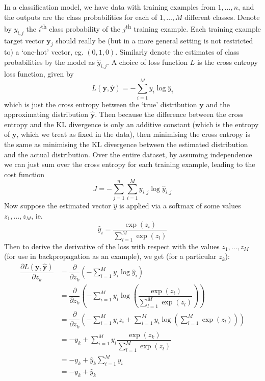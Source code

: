 \documentclass[11pt]{report} %
\begin{document}
In a classification model, we have data with training examples from $1, \dots, n$, and the outputs are the class probabilities for each of $1, \dots, M$ different classes. Denote by $y_{i, j}$ the $i$\textsuperscript{th} class probability of the $j$\textsuperscript{th} training example. Each training example target vector $\mathbf{y}_{j}$ should really be (but in a more general setting is not restricted to) a `one-hot' vector, eg. $\left(0, 1, 0\right)$. Similarly denote the estimates of class probabilities by the model as $\hat{y}_{i, j}$. A choice of loss function $L$ is the cross entropy loss function, given by
\begin{equation}
L\left(\mathbf{y}, \hat{\mathbf{y}}\right) = -\sum_{i = 1}^{M}y_{i}\log\hat{y}_{i}
\end{equation}
which is just the cross entropy between the `true' distribution $\mathbf{y}$ and the approximating distribution $\hat{\mathbf{y}}$. Then because the difference between the cross entropy and the KL divergence is only an additive constant (which is the entropy of $\mathbf{y}$, which we treat as fixed in the data), then minimising the cross entropy is the same as minimising the KL divergence between the estimated distribution and the actual distribution. Over the entire dataset, by assuming independence we can just sum over the cross entropy for each training example, leading to the cost function
\begin{equation}
J = -\sum_{j = 1}^{n}\sum_{i = 1}^{M}y_{i, j}\log\hat{y}_{i, j}
\end{equation}
Now suppose the estimated vector $\hat{y}$ is applied via a softmax of some values $z_{1}, \dots, z_{M}$, ie.
\begin{equation}
\hat{y}_{i} = \dfrac{\exp{\left(z_{i}\right)}}{\sum_{l = 1}^{M}\exp\left(z_{l}\right)}
\end{equation}
Then to derive the derivative of the loss with respect with the values $z_{1}, \dots, z_{M}$ (for use in backpropagation as an example), we get (for a particular $z_{k}$):
\begin{align}
\dfrac{\partial L\left(\mathbf{y}, \hat{\mathbf{y}}\right)}{\partial z_{k}} &= \dfrac{\partial}{\partial z_{k}}\left(-\sum_{i = 1}^{M}y_{i}\log \hat{y}_{i}\right) \\
&= \dfrac{\partial}{\partial z_{k}}\left(-\sum_{i=1}^{M}y_{i}\log\left(\dfrac{\exp\left(z_{i}\right)}{\sum_{l=1}^{M}\exp\left(z_{l}\right)}\right)\right) \\
&= \dfrac{\partial}{\partial z_{k}}\left(-\sum_{i=1}^{M}y_{i}z_{i}+\sum_{i=1}^{M}y_{i}\log\left(\sum_{l=1}^{M}\exp\left(z_{l}\right)\right)\right) \\
&= -y_{k}+\sum_{i=1}^{M}y_{i}\dfrac{\exp\left(z_{k}\right)}{\sum_{l=1}^{M}\exp\left(z_{l}\right)} \\
&= -y_{k}+\hat{y}_{k}\sum_{i=1}^{M}y_{i} \\
&= -y_{k}+\hat{y}_{k}
\end{align}
\end{document}
